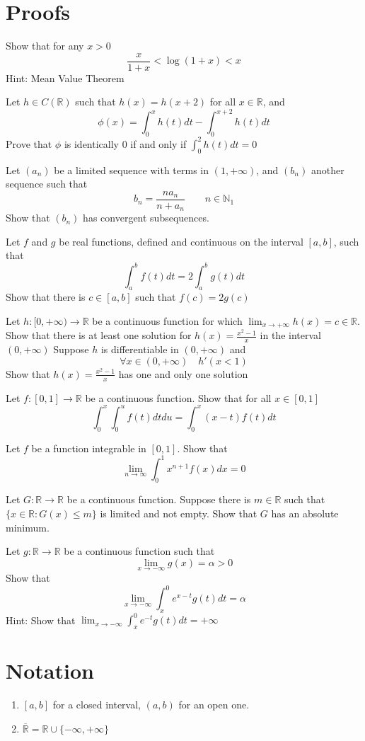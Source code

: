 \documentclass[12pt]{article}
\begin{document}
\section{Proofs}
\begin{ExerciseList}
	\Exercise Show that for any $x>0$
	$$\frac{x}{1+x} < \log(1+x) < x$$
	Hint: Mean Value Theorem

	\Exercise Let $h\in C(\mathbb R)$ such that $h(x) = h(x+2)$ for all $x\in\mathbb R$, and
	$$\phi(x) = \int_0^x{h(t)dt}-\int_0^{x+2}{h(t)dt}$$
	Prove that $\phi$ is identically $0$ if and only if $\int_0^2 h(t)dt = 0$

	\Exercise Let $(a_n)$ be a limited sequence with terms in $(1,+\infty)$, and
	$(b_n)$ another sequence such that $$b_n = \frac{na_n}{n+a_n}\qquad n\in\mathbb N_1$$
	Show that $(b_n)$ has convergent subsequences.

	\Exercise Let $f$ and $g$ be real functions, defined and continuous on the interval $[a,b]$, such that
	$$\int_a^b{f(t)}dt = 2\int_a^b{g(t)}dt$$
	Show that there is $c\in[a,b]$ such that $f(c)=2g(c)$

	\Exercise Let $h\colon [0,+\infty)\to\mathbb R$ be a continuous function
	for which $\lim_{x\to +\infty}h(x)=c\in\mathbb R$.
	\Question Show that there is at least one solution for $h(x)=\frac{x^2-1}{x}$
	in the interval $(0,+\infty)$
	\Question Suppose $h$ is differentiable in $(0,+\infty)$ and
	$$\forall x\in(0,+\infty)\quad h'(x<1)$$
	Show that $h(x)=\frac{x^2-1}{x}$ has one and only one solution

	\Exercise Let $f\colon [0,1]\to\mathbb R$ be a continuous function. Show that
	for all $x\in[0,1]$
	$$\int_0^x{\int_0^u{f(t)}dt}du=\int_0^x{(x-t)f(t)}dt$$

	\Exercise Let $f$ be a function integrable in $[0,1]$. Show that
	$$\lim_{n\to\infty}\int_0^1{x^{n+1}f(x)}dx = 0$$

	\Exercise Let $G\colon \mathbb R\to \mathbb R$ be a continuous function.
	Suppose there is $m\in\mathbb R$ such that $\{ x\in\mathbb R\colon G(x)\le m \}$
	is limited and not empty.
	Show that $G$ has an absolute minimum.

	\Exercise Let $g\colon \mathbb R \to \mathbb R$ be a continuous function such that
	$$\lim_{x\to -\infty}g(x)=\alpha>0$$
	Show that
	$$\lim_{x\to -\infty}\int_x^0 e^{x-t}g(t)dt=\alpha$$
	Hint: Show that $\lim_{x\to -\infty}\int_x^0 e^{-t}g(t)dt=+\infty$
\end{ExerciseList}
\section{Notation}
\begin{enumerate}
	\item  $[a,b]$ for a closed interval, $(a,b)$ for an open one.
	\item $\overline{\mathbb R} = \mathbb R \cup \{-\infty, +\infty\}$
\end{enumerate}
\end{document}
